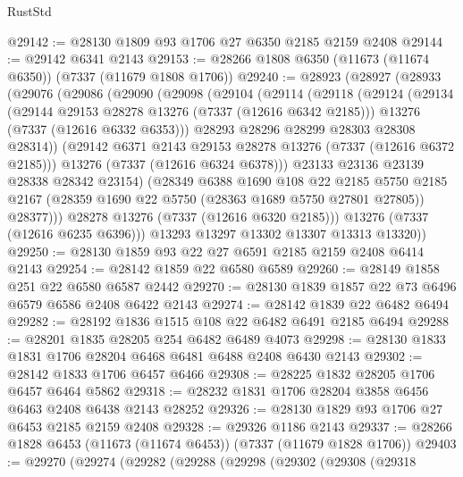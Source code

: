 \begin{lexlean}{RustStd}
\begin{coremodule}
@29142 := @28130 @1809 @93 @1706 @27 @6350 @2185 @2159 @2408
@29144 := @29142 @6341 @2143
@29153 := @28266 @1808 @6350 (@11673 (@11674 @6350)) (@7337 (@11679 @1808 @1706))
@29240 := @28923
    (@28927
      (@28933
        (@29076
          (@29086
            (@29090
              (@29098
                (@29104
                  (@29114
                    (@29118
                      (@29124
                        (@29134
                          (@29144 @29153 @28278 @13276 (@7337 (@12616 @6342 @2185)))
                          @13276
                          (@7337 (@12616 @6332 @6353)))
                        @28293
                        @28296
                        @28299
                        @28303
                        @28308
                        @28314))
                    (@29142 @6371 @2143 @29153 @28278 @13276 (@7337 (@12616 @6372 @2185)))
                    @13276
                    (@7337 (@12616 @6324 @6378)))
                  @23133
                  @23136
                  @23139
                  @28338
                  @28342
                  @23154)
                (@28349
                  @6388
                  @1690
                  @108
                  @22
                  @2185
                  @5750
                  @2185
                  @2167
                  (@28359 @1690 @22 @5750 (@28363 @1689 @5750 @27801 @27805))
                  @28377)))
            @28278
            @13276
            (@7337 (@12616 @6320 @2185)))
          @13276
          (@7337 (@12616 @6235 @6396)))
        @13293
        @13297
        @13302
        @13307
        @13313
        @13320))
@29250 := @28130 @1859 @93 @22 @27 @6591 @2185 @2159 @2408 @6414 @2143
@29254 := @28142 @1859 @22 @6580 @6589
@29260 := @28149 @1858 @251 @22 @6580 @6587 @2442
@29270 := @28130 @1839 @1857 @22 @73 @6496 @6579 @6586 @2408 @6422 @2143
@29274 := @28142 @1839 @22 @6482 @6494
@29282 := @28192 @1836 @1515 @108 @22 @6482 @6491 @2185 @6494
@29288 := @28201 @1835 @28205 @254 @6482 @6489 @4073
@29298 := @28130 @1833 @1831 @1706 @28204 @6468 @6481 @6488 @2408 @6430 @2143
@29302 := @28142 @1833 @1706 @6457 @6466
@29308 := @28225 @1832 @28205 @1706 @6457 @6464 @5862
@29318 := @28232 @1831 @1706 @28204 @3858 @6456 @6463 @2408 @6438 @2143 @28252
@29326 := @28130 @1829 @93 @1706 @27 @6453 @2185 @2159 @2408
@29328 := @29326 @1186 @2143
@29337 := @28266 @1828 @6453 (@11673 (@11674 @6453)) (@7337 (@11679 @1828 @1706))
@29403 := @29270
    (@29274
      (@29282
        (@29288
          (@29298
            (@29302
              (@29308
                (@29318

\end{coremodule}
\end{lexlean}
